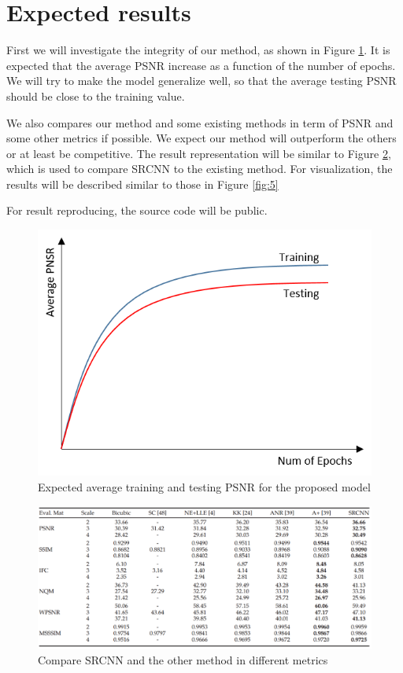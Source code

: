 \documentclass[10pt]{article}
\begin{document}

\section{Expected results} %
\label{sec:expected_results}
First we will investigate the integrity of our method, as shown in Figure \ref{fig:3}. It is expected that the average PSNR increase as a function of the number of epochs. We will try to make the model generalize well, so that the average testing PSNR should be close to the training value.

\noindent
We also compares our method and some existing methods in term of PSNR and some other metrics if possible. We expect our method will outperform the others or at least be competitive. The result representation will be similar to Figure \ref{fig:4}, which is used to compare SRCNN \cite{dong2016image} to the existing method. For visualization, the results will be described similar to those in Figure \ref{fig:5}

\noindent
For result reproducing, the source code will be public. 
\begin{figure}[H]
	\centering
	\includegraphics[scale=0.9]{figs/expectedPSNR.png}
	\caption{Expected average training and testing PSNR for the proposed model}
	\label{fig:3}
\end{figure}


\begin{figure}[H]
	\centering
	\includegraphics[scale=0.4]{figs/PSNR_table.png}
	\caption{Compare SRCNN and the other method in different metrics}
	\label{fig:4}
\end{figure}
\end{document}
